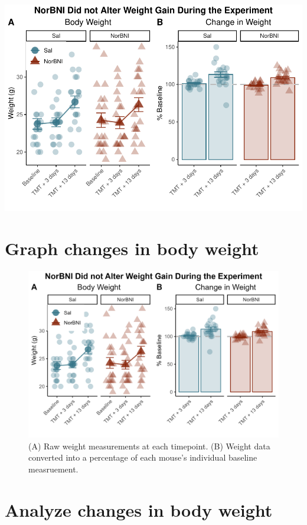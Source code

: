\documentclass[
]{book}
\begin{document}
\includegraphics{_main_files/figure-latex/unnamed-chunk-4-1.pdf}

\hypertarget{graph-changes-in-body-weight}{%
\section{Graph changes in body weight}\label{graph-changes-in-body-weight}}

\begin{figure}
\includegraphics[width=25in]{Panels/Weights} \caption{(A) Raw weight measurements at each timepoint. (B) Weight data converted into a percentage of each mouse's individual baseline measruement.}\label{fig:unnamed-chunk-5}
\end{figure}

\hypertarget{analyze-changes-in-body-weight}{%
\section{Analyze changes in body weight}\label{analyze-changes-in-body-weight}}
\end{document}
